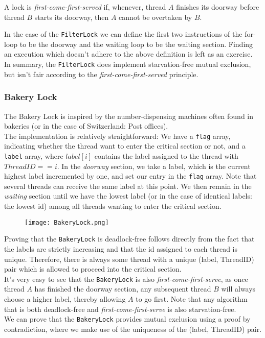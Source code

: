 \documentclass[main]{subfiles}
\begin{document}
\begin{definition}
    A lock is \textit{first-come-first-served} if, whenever, thread $A$ finishes its doorway before thread $B$ starts its doorway, then $A$ cannot be overtaken by $B$.
\end{definition}
In the case of the \texttt{FilterLock} we can define the first two instructions of the for-loop to be the doorway and the waiting loop to be the waiting section. Finding an execution which doesn't adhere to the above definition is left as an exercise.\\[3mm]
In summary, the \texttt{FilterLock} does implement starvation-free mutual exclusion, but isn't fair according to the \textit{first-come-first-served} principle.


\subsubsection{Bakery Lock}
The Bakery Lock is inspired by the number-dispensing machines often found in bakeries (or in the case of Switzerland: Post offices).\\[3mm]
The implementation is relatively straightforward: We have a \texttt{flag} array, indicating whether the thread want to enter the critical section or not, and a \texttt{label} array, where $label[i]$ contains the label assigned to the thread with $ThreadID == i$. In the \textit{doorway} section, we take a label, which is the current highest label incremented by one, and set our entry in the \texttt{flag} array. Note that several threads can receive the same label at this point. We then remain in the \textit{waiting} section until we have the lowest label (or in the case of identical labels: the lowest id) among all threads wanting to enter the critical section. 
\begin{figure}[H]
    \centering
    \texttt{[image: BakeryLock.png]}
\end{figure}
\noindent Proving that the \texttt{BakeryLock} is deadlock-free follows directly from the fact that the labels are strictly increasing and that the id assigned to each thread is unique. Therefore, there is always some thread with a unique (label, ThreadID) pair which is allowed to proceed into the critical section.\\[3mm]
It's very easy to see that the \texttt{BakeryLock} is also \textit{first-come-first-serve}, as once thread $A$ has finished the doorway section, any subsequent thread $B$ will always choose a higher label, thereby allowing $A$ to go first. Note that any algorithm that is both deadlock-free and \textit{first-come-first-serve} is also starvation-free.\\[3mm]
We can prove that the \texttt{BakeryLock} provides mutual exclusion using a proof by contradiction, where we make use of the uniqueness of the (label, ThreadID) pair.
 
\end{document}
